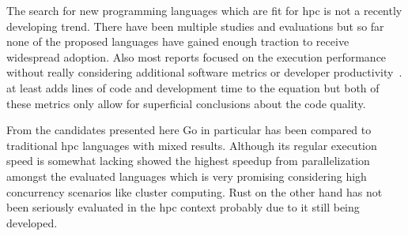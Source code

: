The search for new programming languages which are fit for \gls{hpc} is not a recently developing trend. There have been multiple studies and evaluations but so far none of the proposed languages have gained enough traction to receive widespread adoption. Also most reports focused on the execution performance without really considering additional software metrics or developer productivity~\cite{related_multicore}. at least adds lines of code and development time to the equation but both of these metrics only allow for superficial conclusions about the code quality.

From the candidates presented here Go in particular has been compared to traditional \gls{hpc} languages with mixed results. Although its regular execution speed is somewhat lacking \cite{related_sor_study} showed the highest speedup from parallelization amongst the evaluated languages which is very promising considering high concurrency scenarios like cluster computing. Rust on the other hand has not been seriously evaluated in the \gls{hpc} context probably due to it still being developed.
